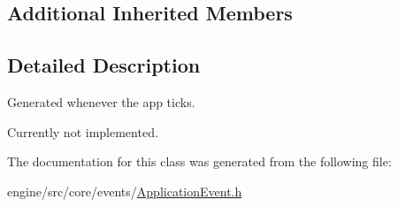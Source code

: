\subsection*{Additional Inherited Members}


\subsection{Detailed Description}
Generated whenever the app ticks. 

Currently not implemented. 

The documentation for this class was generated from the following file\+:\begin{DoxyCompactItemize}
\item 
engine/src/core/events/\hyperlink{ApplicationEvent_8h}{Application\+Event.\+h}\end{DoxyCompactItemize}
